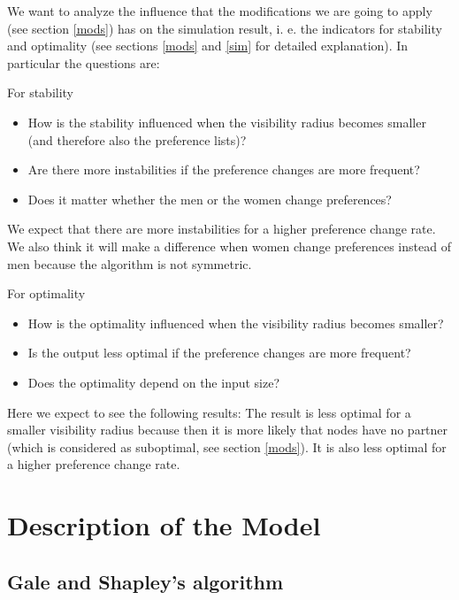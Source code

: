 \documentclass[11pt]{article}
\begin{document}
We want to analyze the influence that the modifications we are going to apply (see section \ref{mods}) has on the simulation result, i. e. the
indicators for stability and optimality (see sections \ref{mods} and \ref{sim} for detailed explanation). In particular the questions are:

\noindent For stability
\begin{itemize}
  \item How is the stability influenced when the visibility radius becomes smaller (and therefore also the preference lists)?
  \item Are there more instabilities if the preference changes are more frequent?
  \item Does it matter whether the men or the women change preferences?
\end{itemize}

We expect that there are more instabilities for a higher preference change rate. We also think it will make a difference when women change preferences
instead of men because the algorithm is not symmetric.

\noindent For optimality
\begin{itemize}
  \item How is the optimality influenced when the visibility radius becomes smaller?
  \item Is the output less optimal if the preference changes are more frequent?
  \item Does the optimality depend on the input size?
\end{itemize}

Here we expect to see the following results: The result is less optimal for a smaller visibility radius because then it is more likely that nodes
have no partner (which is considered as suboptimal, see section \ref{mods}). It is also less optimal for a higher preference change rate.

\section{Description of the Model}

\subsection{Gale and Shapley's algorithm}
\end{document}
